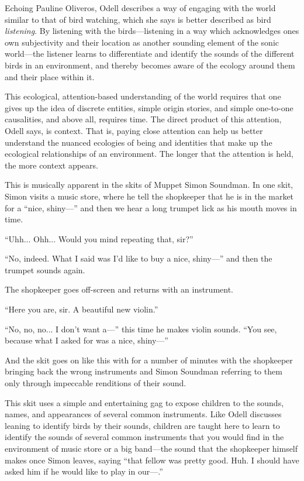 \documentclass[12pt,letterpaper]{article}
\begin{document}
	Echoing Pauline Oliveros, Odell describes a way of engaging with the 
	world similar to that of bird watching, which she says is better 
	described as bird \textit{listening}.
	By listening with the birds---listening in a way which acknowledges
	ones own subjectivity and their location as another sounding element of
	the sonic world---the listener learns to differentiate and identify 
	the sounds 
	of the different birds in an environment, and thereby becomes aware
	of the ecology around them and their place within it.\autocite{Odell} 
	
	This ecological, attention-based understanding of the world requires 
	that one gives up the idea of discrete entities, simple origin stories,
	and simple one-to-one causalities, and above all, requires time.
	The direct product of this attention, Odell says, is context. 
	That is, paying close attention can help us better understand the 
	nuanced ecologies of being and identities that make up the ecological
	relationships of an environment. The longer that the attention is held, 
	the more context appears.\autocite[155]{Odell} 

	This is musically apparent in the skits of Muppet Simon Soundman.
	In one skit, Simon visits a music store, where he tell the shopkeeper
	that he is in the market for a ``nice, shiny---'' and then we hear a
	long trumpet lick as his mouth moves in time. 

	``Uhh... Ohh... Would you mind repeating that, sir?''

	``No, indeed. What I said was I'd like to buy a nice, shiny---'' and
	then the trumpet sounds again. 

	The shopkeeper goes off-screen and returns with an instrument. 
	 
	``Here you are, sir. A beautiful new violin.''

	``No, no, no... I don't want a---'' this time he makes violin
	sounds.  ``You see, because what I asked for was a nice, shiny---''
	
	And the skit goes on like this with for a number of minutes with the 
	shopkeeper bringing back the wrong instruments and Simon Soundman
	referring to them only through impeccable renditions of their sound. 
	
	This skit uses a simple and entertaining gag to expose children to the
	sounds, names, and appearances of several common instruments. Like Odell
	discusses leaning to identify birds by their sounds, children are	
	taught here to learn to identify the sounds of several common 
	instruments that you would find in the environment of music store or 
	a big band---the sound that the shopkeeper himself makes once Simon
	leaves, saying ``that fellow was pretty good. Huh. I should have asked
	him if he would like to play in our---.''  
\end{document}
